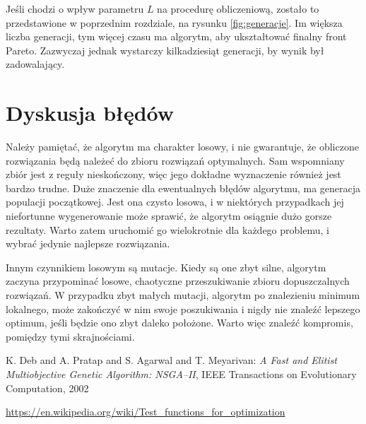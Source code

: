 \documentclass[11pt,a4paper]{article}
\begin{document}
Jeśli chodzi o wpływ parametru $L$ na procedurę obliczeniową, zostało to przedstawione w poprzednim rozdziale, na rysunku \ref{fig:generacje}. Im większa liczba generacji, tym więcej czasu ma algorytm, aby ukształtować finalny front Pareto. Zazwyczaj jednak wystarczy kilkadziesiąt generacji, by wynik był zadowalający. 

\section{Dyskusja błędów}

Należy pamiętać, że algorytm ma charakter losowy, i nie gwarantuje, że obliczone rozwiązania będą należeć do zbioru rozwiązań optymalnych. Sam wspomniany zbiór jest z reguły nieskończony, więc jego dokładne wyznaczenie również jest bardzo trudne. Duże znaczenie dla ewentualnych błędów algorytmu, ma generacja populacji początkowej. Jest ona czysto losowa, i w niektórych przypadkach jej niefortunne wygenerowanie może sprawić, że algorytm osiągnie dużo gorsze rezultaty. Warto zatem uruchomić go wielokrotnie dla każdego problemu, i wybrać jedynie najlepsze rozwiązania. 

Innym czynnikiem losowym są mutacje. Kiedy są one zbyt silne, algorytm zaczyna przypominać losowe, chaotyczne przeszukiwanie zbioru dopuszczalnych rozwiązań. W przypadku zbyt małych mutacji, algorytm po znalezieniu minimum lokalnego, może zakończyć w nim swoje poszukiwania i nigdy nie znaleźć lepszego optimum, jeśli będzie ono zbyt daleko położone. Warto więc znaleźć kompromis, pomiędzy tymi skrajnościami. 

\begin{thebibliography}{9}
 K. Deb and A. Pratap and S. Agarwal and T. Meyarivan:
\emph{A Fast and Elitist Multiobjective Genetic Algorithm: NSGA–II},
IEEE Transactions on Evolutionary Computation, 2002

 \url{https://en.wikipedia.org/wiki/Test_functions_for_optimization}

\end{thebibliography}
\end{document}
